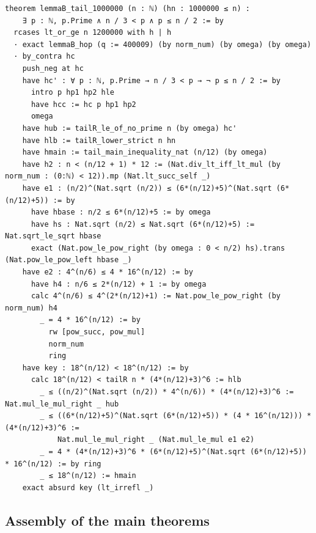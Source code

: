\documentclass[11pt]{article}
\theoremstyle{definition}
\begin{document}
\begin{lstlisting}[basicstyle=\ttfamily\footnotesize,caption={Excerpt of the
proof file (lines 735--767): the tail theorem for $n \ge 10^{6}$
(\texttt{lemmaB\_tail\_1000000}), closing Lemma~\ref{lem:B} on the infinite
regime via the factorial-ratio estimate.},label={lst:tail}]
theorem lemmaB_tail_1000000 (n : ℕ) (hn : 1000000 ≤ n) :
    ∃ p : ℕ, p.Prime ∧ n / 3 < p ∧ p ≤ n / 2 := by
  rcases lt_or_ge n 1200000 with h | h
  · exact lemmaB_hop (q := 400009) (by norm_num) (by omega) (by omega)
  · by_contra hc
    push_neg at hc
    have hc' : ∀ p : ℕ, p.Prime → n / 3 < p → ¬ p ≤ n / 2 := by
      intro p hp1 hp2 hle
      have hcc := hc p hp1 hp2
      omega
    have hub := tailR_le_of_no_prime n (by omega) hc'
    have hlb := tailR_lower_strict n hn
    have hmain := tail_main_inequality_nat (n/12) (by omega)
    have h2 : n < (n/12 + 1) * 12 := (Nat.div_lt_iff_lt_mul (by norm_num : (0:ℕ) < 12)).mp (Nat.lt_succ_self _)
    have e1 : (n/2)^(Nat.sqrt (n/2)) ≤ (6*(n/12)+5)^(Nat.sqrt (6*(n/12)+5)) := by
      have hbase : n/2 ≤ 6*(n/12)+5 := by omega
      have hs : Nat.sqrt (n/2) ≤ Nat.sqrt (6*(n/12)+5) := Nat.sqrt_le_sqrt hbase
      exact (Nat.pow_le_pow_right (by omega : 0 < n/2) hs).trans (Nat.pow_le_pow_left hbase _)
    have e2 : 4^(n/6) ≤ 4 * 16^(n/12) := by
      have h4 : n/6 ≤ 2*(n/12) + 1 := by omega
      calc 4^(n/6) ≤ 4^(2*(n/12)+1) := Nat.pow_le_pow_right (by norm_num) h4
        _ = 4 * 16^(n/12) := by
          rw [pow_succ, pow_mul]
          norm_num
          ring
    have key : 18^(n/12) < 18^(n/12) := by
      calc 18^(n/12) < tailR n * (4*(n/12)+3)^6 := hlb
        _ ≤ ((n/2)^(Nat.sqrt (n/2)) * 4^(n/6)) * (4*(n/12)+3)^6 := Nat.mul_le_mul_right _ hub
        _ ≤ ((6*(n/12)+5)^(Nat.sqrt (6*(n/12)+5)) * (4 * 16^(n/12))) * (4*(n/12)+3)^6 :=
            Nat.mul_le_mul_right _ (Nat.mul_le_mul e1 e2)
        _ = 4 * (4*(n/12)+3)^6 * (6*(n/12)+5)^(Nat.sqrt (6*(n/12)+5)) * 16^(n/12) := by ring
        _ ≤ 18^(n/12) := hmain
    exact absurd key (lt_irrefl _)
\end{lstlisting}

\subsection{Assembly of the main theorems}
\end{document}
